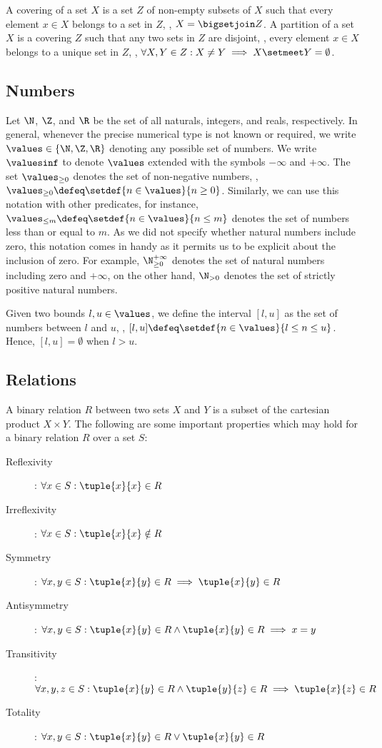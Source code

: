 A covering of a set $X$ is a set $Z$ of non-empty subsets of $X$ such that every element $x \in X$ belongs to a set in $Z$, \ie, $X = \bigsetjoin Z$. A partition of a set $X$ is a covering $Z$ such that any two sets in $Z$ are disjoint, \ie, every element $x \in X$ belongs to a unique set in $Z$, \ie, $\forall X, Y \in Z : X \neq Y \implies X \setmeet Y = \emptyset$.


\subsection{Numbers}

Let $\N$, $\Z$, and $\R$ be the set of all naturals, integers, and reals, respectively.
In general, whenever the precise numerical type is not known or required, we write $\values\in\{\N, \Z, \R\}$ denoting any possible set of numbers.
We write $\valuesinf$ to denote $\values$ extended with the symbols $-\infty$ and $+\infty$.
The set $\values_{\ge 0}$ denotes the set of non-negative numbers, \ie, $\values_{\ge 0} \defeq \setdef{n \in \values}{n \geq 0}$.
Similarly, we can use this notation with other predicates, for instance, $\values_{\le m} \defeq \setdef{n \in \values}{n \leq m}$ denotes the set of numbers less than or equal to $m$.
As we did not specify whether natural numbers include zero, this notation comes in handy as it permits us to be explicit about the inclusion of zero.
For example, $\N_{\ge 0}^{+\infty}$ denotes the set of natural numbers including zero and $+\infty$, on the other hand, $\N_{> 0}$ denotes the set of strictly positive natural numbers.

Given two bounds $l, u \in \values$, we define the interval $[l, u]$ as the set of numbers between $l$ and $u$, \ie, $[l, u] \defeq \setdef{n \in \values}{l \le n \le u}$. Hence, $[l, u] = \emptyset$ when $l > u$.


\subsection{Relations}
A binary relation $R$ between two sets $X$ and $Y$ is a subset of the cartesian product $X \times Y$.
The following are some important properties which may hold for a binary relation $R$ over a set $S$:
\begin{description}
    \item[Reflexivity]: $\forall x \in S : \tuple{x}{x} \in R$
    \item[Irreflexivity]: $\forall x \in S : \tuple{x}{x} \notin R$
    \item[Symmetry]: $\forall x, y \in S : \tuple{x}{y} \in R \implies \tuple{x}{y} \in R$
    \item[Antisymmetry]: $\forall x, y \in S : \tuple{x}{y} \in R \wedge \tuple{x}{y} \in R \implies x = y$
    \item[Transitivity]: $\forall x, y, z \in S : \tuple{x}{y} \in R \wedge \tuple{y}{z} \in R \implies \tuple{x}{z} \in R$
    \item[Totality]: $\forall x, y \in S : \tuple{x}{y} \in R \vee \tuple{x}{y} \in R$
\end{description}

